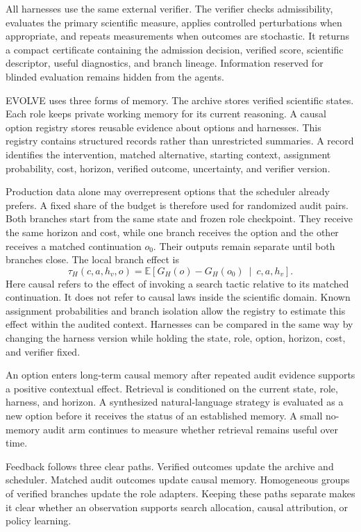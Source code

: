 All harnesses use the same external verifier. The verifier checks admissibility, evaluates the primary scientific measure, applies controlled perturbations when appropriate, and repeats measurements when outcomes are stochastic. It returns a compact certificate containing the admission decision, verified score, scientific descriptor, useful diagnostics, and branch lineage. Information reserved for blinded evaluation remains hidden from the agents.

EVOLVE uses three forms of memory. The archive stores verified scientific states. Each role keeps private working memory for its current reasoning. A causal option registry stores reusable evidence about options and harnesses. This registry contains structured records rather than unrestricted summaries. A record identifies the intervention, matched alternative, starting context, assignment probability, cost, horizon, verified outcome, uncertainty, and verifier version.

Production data alone may overrepresent options that the scheduler already prefers. A fixed share of the budget is therefore used for randomized audit pairs. Both branches start from the same state and frozen role checkpoint. They receive the same horizon and cost, while one branch receives the option and the other receives a matched continuation $o_0$. Their outputs remain separate until both branches close. The local branch effect is
\begin{equation}
\tau_H(c,a,h_v,o)
=
\mathbb E\left[
G_H(o)-G_H(o_0)
\ \middle|\
c,a,h_v
\right].
\label{eqoptioneffect}
\end{equation}
Here causal refers to the effect of invoking a search tactic relative to its matched continuation. It does not refer to causal laws inside the scientific domain. Known assignment probabilities and branch isolation allow the registry to estimate this effect within the audited context. Harnesses can be compared in the same way by changing the harness version while holding the state, role, option, horizon, cost, and verifier fixed.

An option enters long-term causal memory after repeated audit evidence supports a positive contextual effect. Retrieval is conditioned on the current state, role, harness, and horizon. A synthesized natural-language strategy is evaluated as a new option before it receives the status of an established memory. A small no-memory audit arm continues to measure whether retrieval remains useful over time.

Feedback follows three clear paths. Verified outcomes update the archive and scheduler. Matched audit outcomes update causal memory. Homogeneous groups of verified branches update the role adapters. Keeping these paths separate makes it clear whether an observation supports search allocation, causal attribution, or policy learning.

